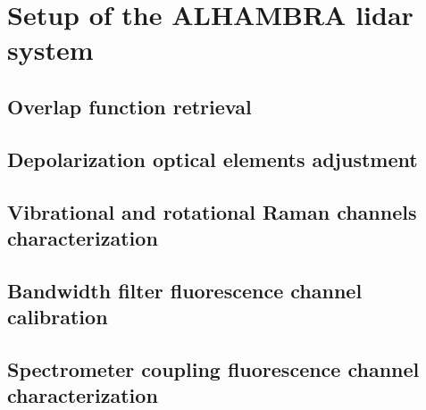 \chapter{Setup of the ALHAMBRA lidar system}
\label{sect::devs01_chapter2}

\section{Overlap function retrieval}
\label{sect::devs01_chapter2_overlap}

\section{Depolarization optical elements adjustment}
\label{sect::devs01_chapter2_depolarization}

\section{Vibrational and rotational Raman channels characterization}
\label{sect::devs01_chapter2_raman}

\section{Bandwidth filter fluorescence channel calibration}
\label{sect::devs01_chapter2_bandwidth}

\section{Spectrometer coupling fluorescence channel characterization}
\label{sect::devs01_chapter2_spectrometer}